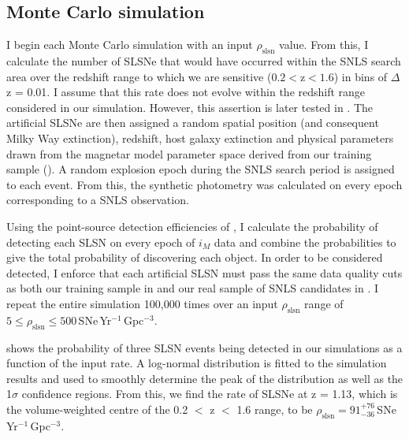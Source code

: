 \subsection{Monte Carlo simulation}
\label{sec:rate-calculation}
I begin each Monte Carlo simulation with an input $\rho_{\mathrm{slsn}}$ value. From this, I calculate the number of SLSNe that would have occurred within the SNLS search area over the redshift range to which we are sensitive ($0.2<\mathrm{z}<1.6$) in bins of $\Delta$z = 0.01. I assume that this rate does not evolve within the redshift range considered in our simulation. However, this assertion is later tested in . The artificial SLSNe are then assigned a random spatial position (and consequent Milky Way extinction), redshift, host galaxy extinction and physical parameters drawn from the magnetar model parameter space derived from our training sample (). A random explosion epoch during the SNLS search period is assigned to each event. From this, the synthetic photometry was calculated on every epoch corresponding to a SNLS observation.

Using the point-source detection efficiencies of \cite{Perrett2010}, I calculate the probability of detecting each SLSN on every epoch of $i_M$ data and combine the probabilities to give the total probability of discovering each object. In order to be considered detected, I enforce that each artificial SLSN must pass the same data quality cuts as both our training sample in  and our real sample of SNLS candidates in . I repeat the entire simulation 100,000 times over an input $\rho_{\mathrm{slsn}}$ range of $5 \leq \rho_{\mathrm{slsn}} \leq 500$\,SNe\,Yr$^{-1}$\,Gpc$^{-3}$.

 shows the probability of three SLSN events being detected in our simulations as a function of the input rate. A log-normal distribution is fitted to the simulation results and used to smoothly determine the peak of the distribution as well as the 1$\sigma$ confidence regions. From this, we find the rate of SLSNe at z = 1.13, which is the volume-weighted centre of the 0.2 $<$ z $<$ 1.6 range, to be $\rho_{\mathrm{slsn}} = 91^{+76}_{-36}$\,SNe\,Yr$^{-1}$\,Gpc$^{-3}$.

